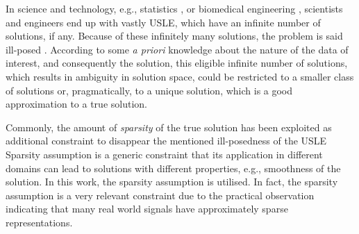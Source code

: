In science and technology, e.g., 
statistics \cite{Cand`es2007a}, or biomedical engineering \cite{Geer2004,Erickson2005,Lustig2007}, 
scientists and engineers end up with vastly USLE, which have an infinite number of solutions, if any. 
Because of these infinitely many solutions, the problem is said ill-posed \cite{Hadamard1902}. 
According to some \emph{a priori} knowledge about the nature of the data of interest, and consequently the solution, this eligible infinite number of solutions, which results in ambiguity in solution space, could be restricted to a smaller class of solutions or, pragmatically, to a unique solution, which is a good approximation to a true solution. 

Commonly, the amount of \emph{sparsity} of the true solution has been exploited as additional constraint to disappear the mentioned ill-posedness of the USLE
Sparsity assumption is a generic constraint that its application in different domains can lead to solutions with different properties, e.g., smoothness of the solution.
In this work, the sparsity assumption is utilised.
In fact, the sparsity assumption is a very relevant constraint due to the practical observation indicating that many real world signals have approximately sparse representations.

